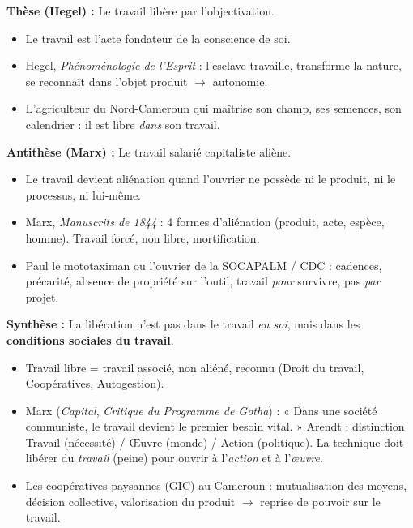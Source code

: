 \documentclass[11pt]{article}
\begin{document}
\begin{exemplebox}
\textbf{Thèse (Hegel) :} Le travail libère par l'objectivation.
\begin{itemize}
    \item[A] Le travail est l'acte fondateur de la conscience de soi.
    \item[E] Hegel, \emph{Phénoménologie de l'Esprit} : l'esclave travaille, transforme la nature, se reconnaît dans l'objet produit $\rightarrow$ autonomie.
    \item[I] L'agriculteur du Nord-Cameroun qui maîtrise son champ, ses semences, son calendrier : il est libre \emph{dans} son travail.
\end{itemize}
\textbf{Antithèse (Marx) :} Le travail salarié capitaliste aliène.
\begin{itemize}
    \item[A] Le travail devient aliénation quand l'ouvrier ne possède ni le produit, ni le processus, ni lui-même.
    \item[E] Marx, \emph{Manuscrits de 1844} : 4 formes d'aliénation (produit, acte, espèce, homme). Travail forcé, non libre, mortification.
    \item[I] Paul le mototaximan ou l'ouvrier de la SOCAPALM / CDC : cadences, précarité, absence de propriété sur l'outil, travail \emph{pour} survivre, pas \emph{par} projet.
\end{itemize}
\textbf{Synthèse :} La libération n'est pas dans le travail \emph{en soi}, mais dans les \textbf{conditions sociales du travail}.
\begin{itemize}
    \item[A] Travail libre = travail associé, non aliéné, reconnu (Droit du travail, Coopératives, Autogestion).
    \item[E] Marx (\emph{Capital}, \emph{Critique du Programme de Gotha}) : « Dans une société communiste, le travail devient le premier besoin vital. » Arendt : distinction Travail (nécessité) / Œuvre (monde) / Action (politique). La technique doit libérer du \emph{travail} (peine) pour ouvrir à l'\emph{action} et à l'\emph{œuvre}.
    \item[I] Les coopératives paysannes (GIC) au Cameroun : mutualisation des moyens, décision collective, valorisation du produit $\rightarrow$ reprise de pouvoir sur le travail.
\end{itemize}
\end{exemplebox}
\end{document}
